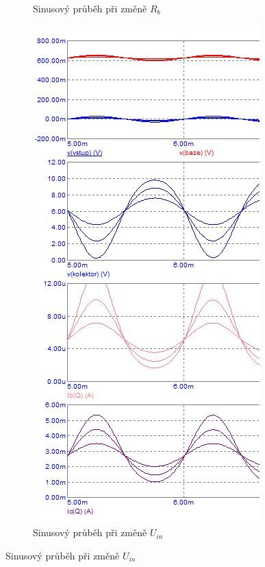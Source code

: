 \documentclass{article}
\begin{document}
\begin{figure}[H]
\begin{minipage}[t]{0.25\textwidth}
\begin{figure}[H]
      \caption{\label{Tranzient_analyz_4} Sinusový průběh při změně \(R_b\)}
    \end{figure}
  \end{minipage}
  \hfill
  \begin{minipage}[t]{0.3\textwidth}
    \begin{figure}[H]
      \includegraphics[width=\textwidth]{PC/BJT/Tranzient_analyza_3.png}
      \caption{\label{Tranzient_analyz_5 } Sinusový průběh při změně \(U_{in}\)}
    \end{figure}
  \end{minipage}
\end{figure}
\end{document}
